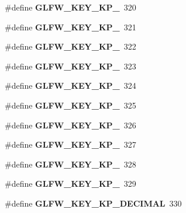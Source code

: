\begin{DoxyCompactItemize}
\#define {\bfseries G\+L\+F\+W\+\_\+\+K\+E\+Y\+\_\+\+K\+P\+\_}~320
\item 
\mbox{\label{group__keys_gaf3a29a334402c5eaf0b3439edf5587c3}} 
\#define {\bfseries G\+L\+F\+W\+\_\+\+K\+E\+Y\+\_\+\+K\+P\+\_}~321
\item 
\mbox{\label{group__keys_gaf82d5a802ab8213c72653d7480c16f13}} 
\#define {\bfseries G\+L\+F\+W\+\_\+\+K\+E\+Y\+\_\+\+K\+P\+\_}~322
\item 
\mbox{\label{group__keys_ga7e25ff30d56cd512828c1d4ae8d54ef2}} 
\#define {\bfseries G\+L\+F\+W\+\_\+\+K\+E\+Y\+\_\+\+K\+P\+\_}~323
\item 
\mbox{\label{group__keys_gada7ec86778b85e0b4de0beea72234aea}} 
\#define {\bfseries G\+L\+F\+W\+\_\+\+K\+E\+Y\+\_\+\+K\+P\+\_}~324
\item 
\mbox{\label{group__keys_ga9a5be274434866c51738cafbb6d26b45}} 
\#define {\bfseries G\+L\+F\+W\+\_\+\+K\+E\+Y\+\_\+\+K\+P\+\_}~325
\item 
\mbox{\label{group__keys_gafc141b0f8450519084c01092a3157faa}} 
\#define {\bfseries G\+L\+F\+W\+\_\+\+K\+E\+Y\+\_\+\+K\+P\+\_}~326
\item 
\mbox{\label{group__keys_ga8882f411f05d04ec77a9563974bbfa53}} 
\#define {\bfseries G\+L\+F\+W\+\_\+\+K\+E\+Y\+\_\+\+K\+P\+\_}~327
\item 
\mbox{\label{group__keys_gab2ea2e6a12f89d315045af520ac78cec}} 
\#define {\bfseries G\+L\+F\+W\+\_\+\+K\+E\+Y\+\_\+\+K\+P\+\_}~328
\item 
\mbox{\label{group__keys_gafb21426b630ed4fcc084868699ba74c1}} 
\#define {\bfseries G\+L\+F\+W\+\_\+\+K\+E\+Y\+\_\+\+K\+P\+\_}~329
\item 
\mbox{\label{group__keys_ga4e231d968796331a9ea0dbfb98d4005b}} 
\#define {\bfseries G\+L\+F\+W\+\_\+\+K\+E\+Y\+\_\+\+K\+P\+\_\+\+D\+E\+C\+I\+M\+AL}~330
\item 
\mbox{\label{group__keys_gabca1733780a273d549129ad0f250d1e5}} 

\end{DoxyCompactItemize}
